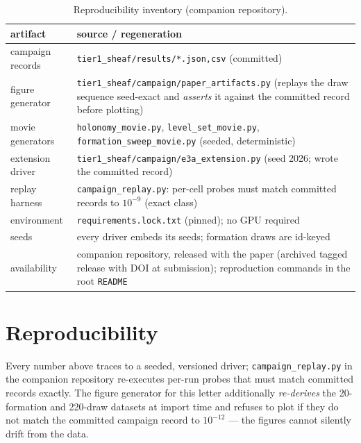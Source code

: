 \documentclass[letterpaper, 10pt, journal]{IEEEtran}
\begin{document}
\begin{table}[t]
\centering
\caption{Reproducibility inventory (companion repository).}
\label{tab:repro}
\begin{tabular}{p{2.6cm}p{4.6cm}}
\toprule
artifact & source / regeneration \\
\midrule
campaign records & \texttt{tier1\_sheaf/results/*.json,csv} (committed) \\
figure generator & \texttt{tier1\_sheaf/campaign/paper\_artifacts.py}
(replays the draw sequence seed-exact and \emph{asserts} it against the
committed record before plotting) \\
movie generators & \texttt{holonomy\_movie.py}, \texttt{level\_set\_movie.py},
\texttt{formation\_sweep\_movie.py} (seeded, deterministic) \\
extension driver & \texttt{tier1\_sheaf/campaign/e3a\_extension.py}
(seed 2026; wrote the committed record) \\
replay harness & \texttt{campaign\_replay.py}: per-cell probes must match
committed records to $10^{-9}$ (exact class) \\
environment & \texttt{requirements.lock.txt} (pinned); no GPU required \\
seeds & every driver embeds its seeds; formation draws are id-keyed \\
availability & companion repository, released with the paper (archived
tagged release with DOI at submission); reproduction commands in the root
\texttt{README} \\
\bottomrule
\end{tabular}
\end{table}

\section{Reproducibility}
Every number above traces to a seeded, versioned driver;
\texttt{campaign\_replay.py} in the companion repository re-executes per-run
probes that must match committed records exactly. The figure generator for
this letter additionally \emph{re-derives} the 20-formation and 220-draw
datasets at import time and refuses to plot if they do not match the
committed campaign record to $10^{-12}$ --- the figures cannot silently
drift from the data.



\end{document}
